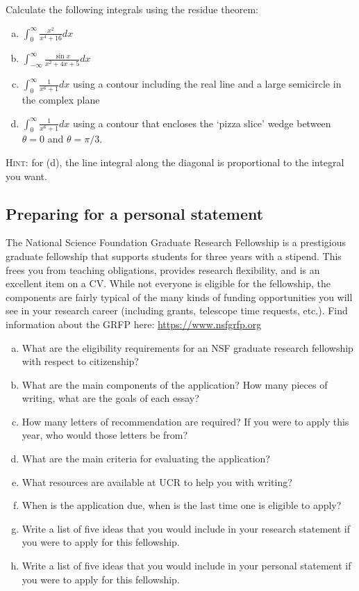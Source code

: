 \documentclass[12pt]{article}
\numberwithin{equation}{subsection}    %
\begin{document}
Calculate the following integrals using the residue theorem:
\begin{enumerate}[(a)]
	\item $\displaystyle \int_{0}^\infty \frac{x^2}{x^4 + 16} dx$ %
	\item $\displaystyle \int_{-\infty}^\infty \frac{\sin x}{x^2 + 4x + 5}dx$ %
	\item $\displaystyle \int_{0}^\infty \frac{1}{x^6+1}dx$ using a contour including the real line and a large semicircle in the complex plane %
	\item $\displaystyle \int_{0}^\infty \frac{1}{x^6+1}dx$ using a contour that encloses the `pizza slice' wedge between $\theta = 0$ and $\theta = \pi/3$. 
\end{enumerate}

\textsc{Hint}: for (d), the line integral along the diagonal is proportional to the integral you want. %


\subsection{Preparing for a personal statement}

The National Science Foundation Graduate Research Fellowship is a prestigious graduate fellowship that supports students for three years with a stipend. This frees you from teaching obligations, provides research flexibility, and is an excellent item on a CV. While not everyone is eligible for the fellowship, the components are fairly typical of the many kinds of funding opportunities you will see in your research career (including grants, telescope time requests, etc.). Find information about the GRFP here: \url{https://www.nsfgrfp.org}

\begin{enumerate}[(a)]
	\item What are the eligibility requirements for an NSF graduate research fellowship with respect to citizenship?
	\item What are the main components of the application? How many pieces of writing, what are the goals of each essay? 
	\item How many letters of recommendation are required? If you were to apply this year, who would those letters be from?
	\item What are the main criteria for evaluating the application?
	\item What resources are available at UCR to help you with writing?
	\item When is the application due, when is the last time one is eligible to apply?
	\item Write a list of five ideas that you would include in your research statement if you were to apply for this fellowship.
	\item Write a list of five ideas that you would include in your personal statement if you were to apply for this fellowship.
\end{enumerate}
\end{document}
